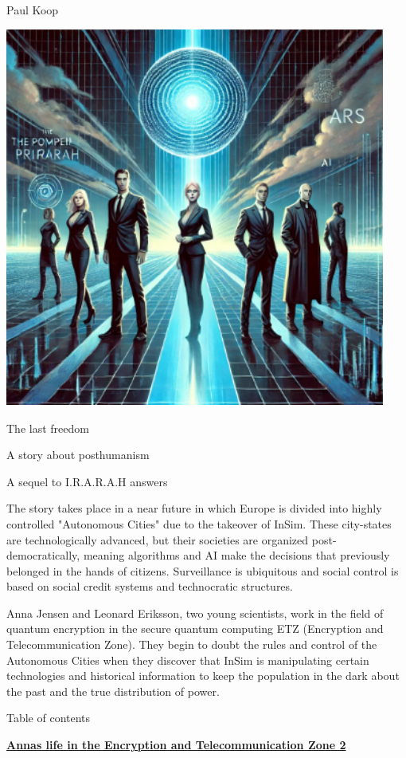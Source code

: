 \documentclass[
]{article}
\author{}
\date{}
\begin{document}
Paul Koop

\includegraphics[width=4.92849in,height=4.92031in]{media/image0001.png}

The last freedom

A story about posthumanism

A sequel to I.R.A.R.A.H answers

The story takes place in a near future in which Europe is divided into
highly controlled "Autonomous Cities" due to the takeover of InSim.
These city-states are technologically advanced, but their societies are
organized post-democratically, meaning algorithms and AI make the
decisions that previously belonged in the hands of citizens.
Surveillance is ubiquitous and social control is based on social credit
systems and technocratic structures.

Anna Jensen and Leonard Eriksson, two young scientists, work in the
field of quantum encryption in the secure quantum computing ETZ
(Encryption and Telecommunication Zone). They begin to doubt the rules
and control of the Autonomous Cities when they discover that InSim is
manipulating certain technologies and historical information to keep the
population in the dark about the past and the true distribution of
power.

Table of contents

\hyperref[annas-life-in-the-encryption-and-telecommunication-zone]{\textbf{Anna\textquotesingle s
life in the Encryption and Telecommunication Zone 2}}
\end{document}
